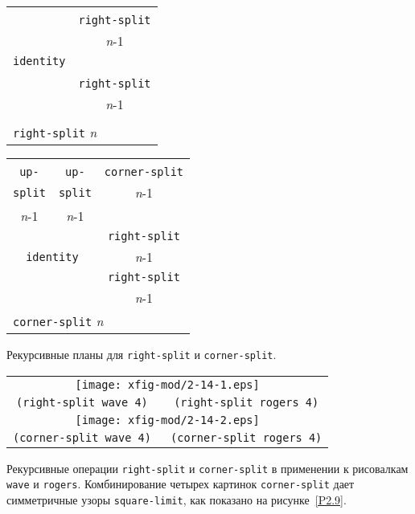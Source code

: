 \begin{cntrfig}
\begin{tabular}{|c|c|}
\hline
                            &  \\
                            &  {\tt right-split} \\
                            &  {\textit n}-1               \\
{\tt identity} &                         \\ \cline{2-2}     
                            & \\
                            &  {\tt right-split}      \\
                            &  {\textit n}-1 \\
                            &  \\                \hline
		
\multicolumn{2}{l}{{\tt right-split} \textit{n}}
\end{tabular}
\hspace{1cm}
\begin{tabular}{|c|c|c|}
\hline
                &             & \\
{\tt up-}        & {\tt up-}    & {\tt corner-split} \\
{\tt split}             & {\tt split}         & {\textit n}-1\\ 
{\textit n}-1                &  {\textit n}-1        &  \\              \hline
\multicolumn{2}{|c|}{}         &{\tt right-split} \\
\multicolumn{2}{|c|}{{\tt identity}} & {\textit n}-1 \\ \cline{3-3} 
\multicolumn{2}{|c|}{}       & {\tt right-split}\\
\multicolumn{2}{|c|}{}       & {\textit n}-1 \\
\hline
\multicolumn{3}{l}{\texttt{corner-split} \textit{n}}
\end{tabular}
\caption{Рекурсивные планы для
{\tt right-split} и {\tt corner-split}.}
\label{P2.13}

\end{cntrfig}


\begin{cntrfig}
\begin{tabular}{cc}
\multicolumn{2}{c}{\texttt{[image: xfig-mod/2-14-1.eps]}} \\
\tt{(right-split wave 4)}  & \tt{(right-split rogers 4)}\\[8pt]
\multicolumn{2}{c}{\texttt{[image: xfig-mod/2-14-2.eps]}} \\
\tt{(corner-split wave 4)} & \tt{(corner-split rogers 4)}
\end{tabular}

\caption{Рекурсивные операции
{\tt right-split} и {\tt corner-split} в применении к
рисовалкам {\tt wave} и {\tt rogers}. Комбинирование
четырех картинок {\tt corner-split} дает симметричные узоры
{\tt square-limit}, как показано на рисунке~\ref{P2.9}.}
\label{P2.14}
\end{cntrfig}

